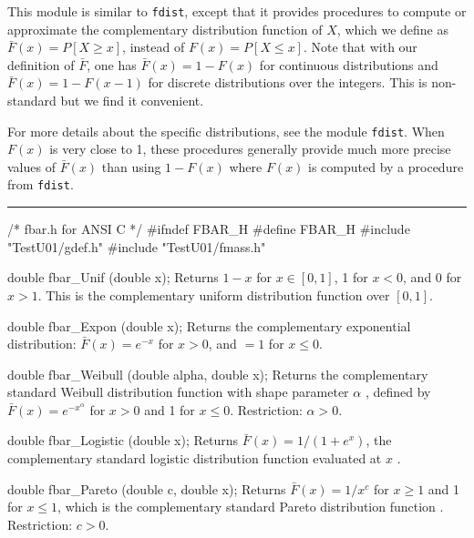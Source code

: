 
This module is similar to {\tt fdist}, except that it provides procedures
to compute or approximate the complementary distribution function of $X$,
which we define as $\bar F(x) = P[X\ge x]$, instead of $F(x)=P[X\le x]$.
Note that with our definition of $\bar F$, one has
$\bar F(x) = 1 - F(x)$ for continuous distributions and
$\bar F(x) = 1 - F(x-1)$ for discrete distributions over the integers.
This is non-standard but we find it convenient.

For more details about the specific distributions, 
see the module {\tt fdist}.
When $F(x)$ is very close to 1, these procedures generally provide much 
more precise values of $\bar F(x)$ than using $1-F(x)$ where $F(x)$ is
computed by a procedure from {\tt fdist}.


\bigskip
\hrule
\code\hide
/* fbar.h for ANSI C */
#ifndef FBAR_H
#define FBAR_H
\endhide
#include "TestU01/gdef.h"
#include "TestU01/fmass.h"
\endcode


\code

double fbar_Unif (double x);
\endcode
  \tab
  Returns $1-x$ for $x \in [0, 1]$, 1 for $x<0$, and 0 for $x>1$.
  This is the complementary uniform distribution function over $[0, 1]$.
 \endtab
\code


double fbar_Expon (double x);
\endcode
  \tab
  Returns the complementary exponential distribution:
  $\bar F(x) = e^{- x}$ for $x>0$, and $=1$ for $x\le 0$.
 \endtab
\code


double fbar_Weibull (double alpha, double x);
\endcode
  \tab
  Returns the complementary standard Weibull distribution function 
  with shape parameter $\alpha$ \cite{tJOH95a}, defined by 
  $\bar F(x) = e^{- x^\alpha}$ for $x>0$ and 1 for $x\le 0$.
  Restriction: $\alpha > 0$.
 \endtab
\code


double fbar_Logistic (double x);
\endcode
  \tab
  Returns $\bar F(x) = 1/(1 + e^{x})$, the complementary standard 
  logistic distribution function evaluated at $x$ \cite{tJOH95b}.
 \endtab
\code


double fbar_Pareto (double c, double x);
\endcode
  \tab
  Returns $\bar F(x) = 1/x^c$ for $x\ge 1$ and 1 for $x\le 1$, 
  which is the complementary standard Pareto
  distribution function \cite{tJOH95a}.
  Restriction: $c > 0$.
 \endtab
\code


